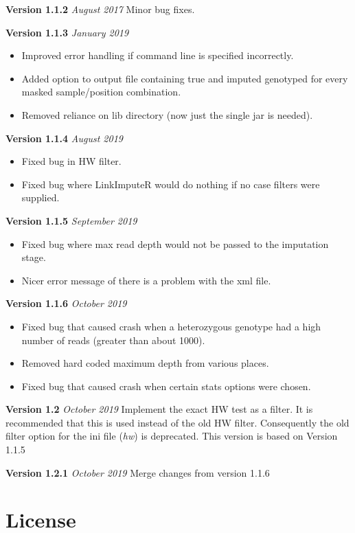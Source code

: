 \documentclass[10pt]{report}
\begin{document}
\textbf{Version 1.1.2} \textit{August 2017} Minor bug fixes.

\textbf{Version 1.1.3} \textit{January 2019}
\begin{itemize}
    \item Improved error handling if command line is specified incorrectly.
    \item Added option to output file containing true and imputed genotyped for every masked sample/position combination.
    \item Removed reliance on lib directory (now just the single jar is needed).
\end{itemize}

\textbf{Version 1.1.4} \textit{August 2019}
\begin{itemize}
    \item Fixed bug in HW filter.
    \item Fixed bug where LinkImputeR would do nothing if no case filters were supplied.
\end{itemize}

\textbf{Version 1.1.5} \textit{September 2019}
\begin{itemize}
    \item Fixed bug where max read depth would not be passed to the imputation stage.
    \item Nicer error message of there is a problem with the xml file.
\end{itemize}

\textbf{Version 1.1.6} \textit{October 2019}
\begin{itemize}
    \item Fixed bug that caused crash when a heterozygous genotype had a high number of reads (greater than about 1000).
    \item Removed hard coded maximum depth from various places.
    \item Fixed bug that caused crash when certain stats options were chosen.
\end{itemize}

\textbf{Version 1.2} \textit{October 2019} Implement the exact HW test as a filter.  It is recommended that this is used instead of the old HW filter.  Consequently the old filter option for the ini file (\emph{hw}) is deprecated.  This version is based on Version 1.1.5

\textbf{Version 1.2.1} \textit{October 2019} Merge changes from version 1.1.6


\section{License}
\end{document}
